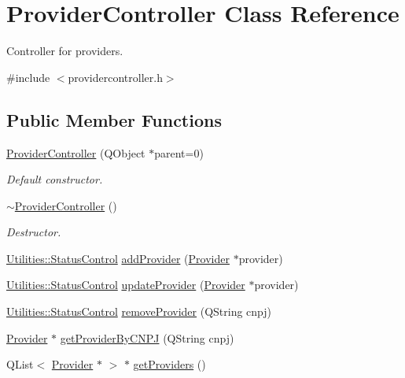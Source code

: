 \hypertarget{class_provider_controller}{\section{\-Provider\-Controller \-Class \-Reference}
\label{class_provider_controller}
}


\-Controller for providers.  




{\ttfamily \#include $<$providercontroller.\-h$>$}

\subsection*{\-Public \-Member \-Functions}
\begin{DoxyCompactItemize}
\item 
\hyperlink{class_provider_controller_acc445d4c4bdb82fc1f401bbb6eec5dd6}{\-Provider\-Controller} (\-Q\-Object $\ast$parent=0)
\begin{DoxyCompactList}\small\item\em \-Default constructor. \end{DoxyCompactList}\item 
\hyperlink{class_provider_controller_a2dd8f33543c566c2dd11af13dc11815a}{$\sim$\-Provider\-Controller} ()
\begin{DoxyCompactList}\small\item\em \-Destructor. \end{DoxyCompactList}\item 
\hyperlink{class_utilities_a2974f062d85bdb0c444a1cbe554bf228}{\-Utilities\-::\-Status\-Control} \hyperlink{class_provider_controller_a7e1a2e9da40bbbd96145b5866d3bf084}{add\-Provider} (\hyperlink{class_provider}{\-Provider} $\ast$provider)
\item 
\hyperlink{class_utilities_a2974f062d85bdb0c444a1cbe554bf228}{\-Utilities\-::\-Status\-Control} \hyperlink{class_provider_controller_a215cc537e0e915016245e2ec8692cff8}{update\-Provider} (\hyperlink{class_provider}{\-Provider} $\ast$provider)
\item 
\hyperlink{class_utilities_a2974f062d85bdb0c444a1cbe554bf228}{\-Utilities\-::\-Status\-Control} \hyperlink{class_provider_controller_a0f58edcd9e43b7572d1e8b8cf7fb6183}{remove\-Provider} (\-Q\-String cnpj)
\item 
\hyperlink{class_provider}{\-Provider} $\ast$ \hyperlink{class_provider_controller_a841a5e1a5fc16eb498e9b5a05efa1f87}{get\-Provider\-By\-C\-N\-P\-J} (\-Q\-String cnpj)
\item 
\-Q\-List$<$ \hyperlink{class_provider}{\-Provider} $\ast$ $>$ $\ast$ \hyperlink{class_provider_controller_a4623508367c6e1254c0834294875fbe8}{get\-Providers} ()
\end{DoxyCompactItemize}



